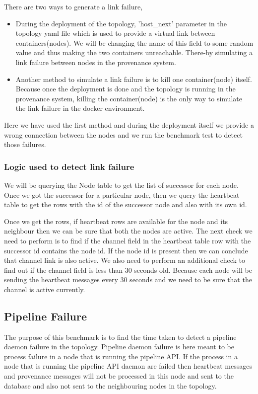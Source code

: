 There are two ways to generate a link failure,
    \begin{itemize}
        \item During the deployment of the topology, 'host\_next' parameter in the topology yaml file which is used to provide a virtual link between containers(nodes). We will be changing the name of this field to some random value and thus making the two containers unreachable. There-by simulating a link failure between nodes in the provenance system.
        \item Another method to simulate a link failure is to kill one container(node) itself. Because once the deployment is done and the topology is running in the provenance system, killing the container(node) is the only way to simulate the link failure in the docker environment.
    \end{itemize}

Here we have used the first method and during the deployment itself we provide a wrong connection between the nodes and we run the benchmark test to detect those failures.

\subsubsection{Logic used to detect link failure}

We will be querying the Node table to get the list of successor for each node. Once we got the successor for a particular node, then we query the heartbeat table to get the rows with the id of the successor node and also with its own id.

Once we get the rows, if heartbeat rows are available for the node and its neighbour then we can be sure that both the nodes are active.
The next check we need to perform is to find if the channel field in the heartbeat table row with the successor id contains the node id.
If the node id is present then we can conclude that channel link is also active. We also need to perform an additional check to find out if the channel field is less than 30 seconds old. Because each node will be sending the heartbeat messages every 30 seconds and we need to be sure that the channel is active currently.

\subsection{Pipeline Failure}

The purpose of this benchmark is to find the time taken to detect a pipeline daemon failure in the topology. Pipeline daemon failure is here meant to be process failure in a node that is running the pipeline API. If the process in a node that is running the pipeline API daemon are failed then heartbeat messages and provenance messages will not be processed in this node and sent to the database and also not sent to the neighbouring nodes in the topology.


